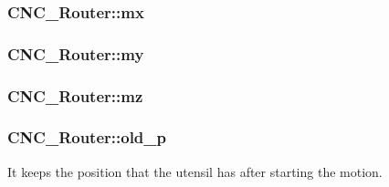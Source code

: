 \hypertarget{class_c_n_c___router_aa6009653314607491aa277b1f3c9bf85}{
\subsubsection[{mx}]{ C\+N\+C\+\_\+\+Router\+::mx\hspace{0.3cm}{\ttfamily [private]}}}\label{class_c_n_c___router_aa6009653314607491aa277b1f3c9bf85}
\hypertarget{class_c_n_c___router_ac3fb4521615d90ff7baa6bdb287d97c9}{
\subsubsection[{my}]{ C\+N\+C\+\_\+\+Router\+::my\hspace{0.3cm}{\ttfamily [private]}}}\label{class_c_n_c___router_ac3fb4521615d90ff7baa6bdb287d97c9}
\hypertarget{class_c_n_c___router_add549ccc206f5feff41f9e818e370ef8}{
\subsubsection[{mz}]{ C\+N\+C\+\_\+\+Router\+::mz\hspace{0.3cm}{\ttfamily [private]}}}\label{class_c_n_c___router_add549ccc206f5feff41f9e818e370ef8}
\hypertarget{class_c_n_c___router_afd338336ec37545574369a5f71ff310b}{
\subsubsection[{old\+\_\+p}]{ C\+N\+C\+\_\+\+Router\+::old\+\_\+p\hspace{0.3cm}{\ttfamily [private]}}}\label{class_c_n_c___router_afd338336ec37545574369a5f71ff310b}


It keeps the position that the utensil has after starting the motion. 

